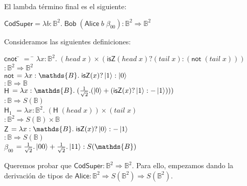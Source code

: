 \documentclass[a4paper,11pt]{article}
\begin{document}
El lambda término final es el siguiente:

\begin{tabbing}
  $\textsf{CodSuper} = \lambda b : \mathds{B}^2. \; \textsf{Bob} \; (\textsf{Alice} \; b \; \beta_{00}) 
  : \mathds{B}^2 \Rightarrow \mathds{B}^2$
\end{tabbing}

Consideramos las siguientes definiciones:

\begin{tabbing}
  $\textsf{cnot}$ \= $=$ \= $\lambda x: \mathds{B}^2. \; ( head \; x) \times (\textsf{isZ} ( head \; x) ?
  (tail \; x) : (\textsf{not} \; (tail \; x)))$ \\
  \> \> $: \mathds{B}^2 \Rightarrow \mathds{B}^2$ \\

  $\textsf{not}$ \> $= \lambda x: \mathds{B}. \; \textsf{isZ} (x) ? \ket{1} : \ket{0}$ \\
  \> \> $: \mathds{B} \Rightarrow \mathds{B}$ \\


  $\textsf{H}$ \> $= \lambda x : \mathds{B}. \; (\frac{1}{\sqrt{2}}.(\ket{0} + (\textsf{isZ}(x) ? \ket{1} : -\ket{1})))$ \\
  \> \> $: \mathds{B} \Rightarrow S(\mathds{B})$ \\

  $\textsf{H}_{1}$ \> $= \lambda x : \mathds{B}^2 . \; (\textsf{H} \; (head \; x)) \times (tail \; x)$ \\
  \> \> $: \mathds{B}^2 \Rightarrow S(\mathds{B}) \times \mathds{B}$ \\

  $\textsf{Z}$ \> $= \lambda x : \mathds{B}. \; \textsf{isZ}(x) ? \ket{0} : - \ket{1}$ \\
  \> \> $: \mathds{B} \Rightarrow S(\mathds{B})$ \\

  $\beta_{00}$ \> $= \frac{1}{\sqrt{2}}.\ket{00} + \frac{1}{\sqrt{2}}.\ket{11} : S(\mathds{B})$
  
\end{tabbing}

Queremos probar que $\textsf{CodSuper} : \mathds{B}^2 \Rightarrow \mathds{B}^2$.
Para ello, empezamos dando la derivación de tipos de $\textsf{Alice} : \mathds{B}^2 \Rightarrow S(\mathds{B}^2) \Rightarrow S(\mathds{B}^2)$.
\end{document}
